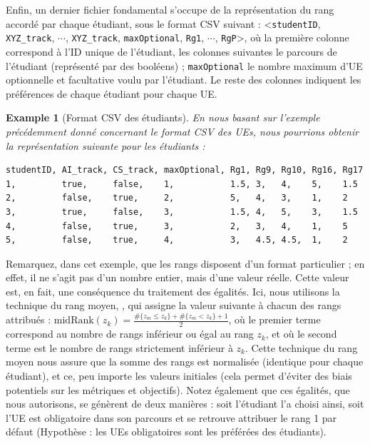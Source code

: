 \documentclass{rapport}
\theoremstyle{definition}
\theoremstyle{remark}
\theoremstyle{plain}
\newtheorem{example}{Example}
\theoremstyle{definition}
\theoremstyle{definition}
\theoremstyle{remark}
\theoremstyle{definition}
\begin{document}
Enfin, un dernier fichier fondamental s'occupe de la représentation du rang accordé par chaque étudiant, sous le format CSV suivant : <\texttt{studentID}, \texttt{XYZ\_track}, $\cdots$, \texttt{XYZ\_track}, \texttt{maxOptional}, \texttt{Rg1}, $\cdots$, \texttt{RgP}>, où la première colonne correspond à l'ID unique de l'étudiant, les colonnes suivantes le parcours de l'étudiant (représenté par des booléens) ; \texttt{maxOptional} le nombre maximum d'UE optionnelle et facultative voulu par l'étudiant. Le reste des colonnes indiquent les préférences de chaque étudiant pour chaque UE.
\begin{example}[Format CSV des étudiants]
En nous basant sur l'exemple précédemment donné concernant le format CSV des UEs, nous pourrions obtenir la représentation suivante pour les étudiants :
\end{example}
\vspace{-\baselineskip}
\begin{verbatim}
studentID, AI_track, CS_track, maxOptional, Rg1, Rg9, Rg10, Rg16, Rg17
1,         true,     false,    1,           1.5, 3,   4,    5,    1.5
2,         false,    true,     2,           5,   4,   3,    1,    2
3,         true,     false,    3,           1.5, 4,   5,    3,    1.5
4,         false,    true,     3,           2,   3,   4,    1,    5
5,         false,    true,     4,           3,   4.5, 4.5,  1,    2
\end{verbatim}

Remarquez, dans cet exemple, que les rangs disposent d'un format particulier ; en effet, il ne s'agit pas d'un nombre entier, mais d'une valeur réelle. Cette valeur est, en fait, une conséquence du traitement des égalités.
Ici, nous utilisons la technique du rang moyen, \cite{Philip2021}, qui assigne la valeur suivante à chacun des rangs attribués : $\text{midRank}(z_k)=\frac{\#\{z_m\le z_k\}+\#\{z_m<z_k\}+1}{2}$, où le premier terme correspond au nombre de rangs inférieur ou égal au rang $z_k$, et où le second terme est le nombre de rangs strictement inférieur à $z_k$. Cette technique du rang moyen nous assure que la somme des rangs est normalisée (identique pour chaque étudiant), et ce, peu importe les valeurs initiales (cela permet d'éviter des biais potentiels sur les métriques et objectifs).
Notez également que ces égalités, que nous autorisons, se génèrent de deux manières : soit l'étudiant l'a choisi ainsi, soit l'UE est obligatoire dans son parcours et se retrouve attribuer le rang 1 par défaut (Hypothèse : les UEs obligatoires sont les préférées des étudiants).
\end{document}
